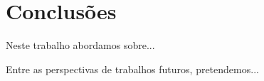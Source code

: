 \chapter*{Conclusões}
\hypertarget{conc}{}

Neste trabalho abordamos sobre...

Entre as perspectivas de trabalhos futuros, pretendemos...
